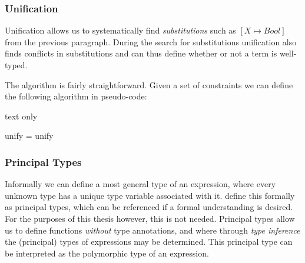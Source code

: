 \subsubsection{Unification}
Unification allows us to systematically find \textit{substitutions} such as $[X \mapsto \textit{Bool}]$ from the previous paragraph.
During the search for substitutions unification also finds conflicts in substitutions and can thus define whether or not a term is well-typed.

The algorithm is fairly straightforward.
Given a set of constraints we can define the following algorithm in pseudo-code:
\begin{changemargin}{1cm}{0cm}
\begin{expansionno}{text only}
\begin{code}
unify = unify 
\end{code}
\end{expansionno}
\end{changemargin}

\subsubsection{Principal Types}
Informally we can define a most general type of an expression, where every unknown type has a unique type variable associated with it.
\citeauthor{pierce2002types} define\cite{pierce2002types} this formally as principal types, which can be referenced if a formal understanding is desired.
For the purposes of this thesis however, this is not needed.
Principal types allow us to define functions \textit{without} type annotations, and where through \textit{type inference} the (principal) types of expressions may be determined.
This principal type can be interpreted as the polymorphic type of an expression.

